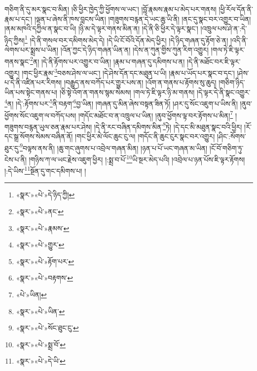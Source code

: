 གཅིག་ནི་དུ་མར་སྣང་བ་མིན། །ཅི་ཕྱིར་ཁྱེད་ཀྱི་ཕྱོགས་ལ་ཡང་། །བློ་རྣམས་རྣམ་པ་མེད་པར་གནས། །ཕྱི་རོལ་དོན་ནི་རྣམ་པ་དང་། །ལྡན་པ་ཞེས་ནི་ཁས་བླངས་ཡིན། །གཟུགས་བརྙན་དེ་ཡང་ཆུ་ཡི་ནི། །ནང་དུ་སྣང་བར་འགྱུར་བ་ཡིན། །ནམ་མཁའི་དཀྱིལ་ན་སྣང་བ་ཡི། །ཉི་མ་དེ་ལྟར་གནས་མིན་ན། །དེ་ནི་ཅི་ཕྱིར་དེ་ལྟར་སྣང་། །འཁྲུལ་པས་ཤེ་ན་:དེ་ཉིད་ཀྱིས།\footnote{«སྣར་»«པེ་»དེ་ཉིད་ཀྱི།} །དེ་ནི་གསལ་བར་དམིགས་མེད་དེ། །དེ་ཡི་ངོ་བོའི་དོན་མེད་ཕྱིར། །དེ་ཉིད་གཞན་དུ་རྟོག་ཅེ་ན། །འདི་ནི་ལེགས་པར་སྨྲས་པ་ཡིན། །འོན་ཀྱང་དེ་ཉིད་གཞན་ཡིན་ན། །དེས་ན་ཀུན་གྱིས་ཀུན་རིག་འགྱུར། །གལ་ཏེ་ཇི་ལྟར་གནས་སྣང་\footnote{«སྣར་»«པེ་»ནང་}ན། །དེ་ནི་རྟོགས་པར་འགྱུར་བ་ཡིན། །རྣམ་པ་གཞན་དུ་དམིགས་པ་ན། །དེ་ནི་མཐོང་བར་ཇི་ལྟར་འགྱུར། །གང་ཕྱིར་རྣམ་\footnote{«སྣར་»«པེ་»རྣམས་}བཅས་ཤེས་ལ་ཡང་། །དེ་ཤེས་དོན་དང་མཐུན་པ་ཡི། །རྣམ་པ་ཡོད་པར་སྣང་བ་དང་། །ཤེས་པ་དེ་ནི་འཛིན་པར་རིགས། །བརྒྱུད་ནས་བཀོད་པར་གྱུར་པས་ན། །འོག་ན་གནས་པ་རྟོགས་སུ་ཆུད། །གཅིག་ཉིད་ཡིན་པས་སྟེང་གནས་པ། །ཅི་སྟེ་འོག་ན་གནས་སྙམ་སེམས། །གལ་ཏེ་ཇི་ལྟར་ཉི་མ་གནས། །དེ་ལྟར་དེ་ནི་སྣང་འགྱུར་\footnote{«སྣར་»«པེ་»གྱུར་}ན། །དེ་:རྟོགས་པར་\footnote{«སྣར་»«པེ་»རྟོག་པར་}ནི་བརྟག་\footnote{«སྣར་»«པེ་»བརྟགས་}བྱ་ཡིན། །གཞན་དུ་མིན་ཞེས་བསྟན་ཟིན་ཏོ། །ཤར་དུ་སོང་འཇུག་པ་ཡིས་ནི། །ནུབ་ཕྱོགས་སོང་འཇུག་ལ་བཀོད་པས། །གདོང་མཐོང་བ་ན་འཁྲུལ་པ་ཡིན། །ནུབ་ཕྱོགས་ལྟ་བར་རྟོགས་པ་མིན།\footnote{«པེ་»ཡིན།} །གཟུགས་བརྙན་ཡུལ་ཅན་རྣམ་པར་ཤེས། །དེ་ནི་རང་བཞིན་དམིགས་མིན་\footnote{«སྣར་»«པེ་»ཡིན་}ཏེ། །དེ་དང་མི་མཐུན་སྣང་བའི་ཕྱིར། །རོ་དང་སྒྲ་སོགས་སེམས་བཞིན་ནོ། །གང་ཕྱིར་མེ་ལོང་ཆུང་ངུ་ལ། །གདོང་ནི་ཆུང་ངུར་སྣང་བར་འགྱུར། །ཤིང་:སོགས་ཐུར་དུ་\footnote{«སྣར་»«པེ་»སོང་ཐུང་ངུ་}བལྟས་ནས་ནི། །ཆུ་གང་ཞུགས་པ་འབྲེལ་གཞན་མིན། །ཉན་པ་པོ་ཡང་གཞན་མ་ཡིན། །ངོ་བོ་གཅིག་ཏུ་ངེས་པ་ནི། །གཉིས་ཀ་ལ་ཡང་རྗེས་འཇུག་ཕྱིར། །:སྨྲ་བ་པོ་\footnote{«སྣར་»«པེ་»སྨྲ་བོ་}ཡི་སྔར་མེད་པའི། །འབྲེལ་པ་ཉན་པོས་ཇི་ལྟར་རྟོགས། །:དེ་ཡིས་\footnote{«སྣར་»«པེ་»དེ་ཡི་}སྔོན་དུ་གང་དམིགས་པ། །
